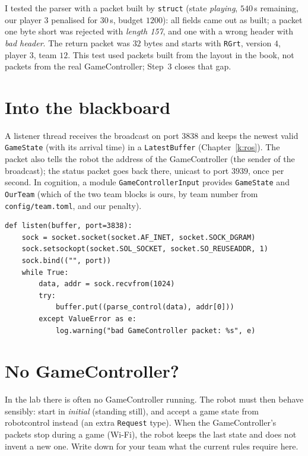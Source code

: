 I tested the parser with a packet built by \texttt{struct} (state \emph{playing}, $540$\,s remaining, our player $3$ penalised for $30$\,s, budget $1200$): all fields came out as built; a packet one byte short was rejected with \emph{length 157}, and one with a wrong header with \emph{bad header}. The return packet was $32$ bytes and starts with \texttt{RGrt}, version $4$, player $3$, team $12$. This test used packets built from the layout in the book, not packets from the real GameController; Step~3 closes that gap.

\section*{Into the blackboard}
A listener thread receives the broadcast on port $3838$ and keeps the newest valid \texttt{GameState} (with its arrival time) in a \texttt{LatestBuffer} (Chapter~\ref{k:ros}). The packet also tells the robot the address of the GameController (the sender of the broadcast); the status packet goes back there, unicast to port $3939$, once per second. In cognition, a module \texttt{GameControllerInput} provides \texttt{GameState} and \texttt{OurTeam} (which of the two team blocks is ours, by team number from \texttt{config/team.toml}, and our penalty).
\begin{verbatim}
def listen(buffer, port=3838):
    sock = socket.socket(socket.AF_INET, socket.SOCK_DGRAM)
    sock.setsockopt(socket.SOL_SOCKET, socket.SO_REUSEADDR, 1)
    sock.bind(("", port))
    while True:
        data, addr = sock.recvfrom(1024)
        try:
            buffer.put((parse_control(data), addr[0]))
        except ValueError as e:
            log.warning("bad GameController packet: %s", e)
\end{verbatim}

\section*{No GameController?}
In the lab there is often no GameController running. The robot must then behave sensibly: start in \emph{initial} (standing still), and accept a game state from robotcontrol instead (an extra \texttt{Request} type). When the GameController's packets stop during a game (Wi-Fi), the robot keeps the last state and does not invent a new one. Write down for your team what the current rules require here\guess.

